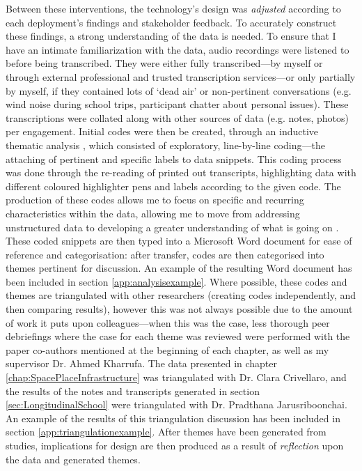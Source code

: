 Between these interventions, the technology's design was \textit{adjusted} according to each deployment's findings and stakeholder feedback. To accurately construct these findings, a strong understanding of the data is needed. To ensure that I have an intimate familiarization with the data, audio recordings were listened to before being transcribed. They were either fully transcribed---by myself or through external professional and trusted transcription services---or only partially by myself, if they contained lots of `dead air' or non-pertinent conversations (e.g. wind noise during school trips, participant chatter about personal issues). These transcriptions were collated along with other sources of data (e.g. notes, photos) per engagement. Initial codes were then be created, through an inductive thematic analysis \citep{nowell2017}, which consisted of exploratory, line-by-line coding---the attaching of pertinent and specific labels to data snippets. This coding process was done through the re-reading of printed out transcripts, highlighting data with different coloured highlighter pens and labels according to the given code. The production of these codes allows me to focus on specific and recurring characteristics within the data, allowing me to move from addressing unstructured data to developing a greater understanding of what is going on \citep{richards2013}. These coded snippets are then typed into a Microsoft Word document for ease of reference and categorisation: after transfer, codes are then categorised into themes pertinent for discussion. An example of the resulting Word document has been included in section \ref{app:analysisexample}. Where possible, these codes and themes are triangulated with other researchers (creating codes independently, and then comparing results), however this was not always possible due to the amount of work it puts upon colleagues---when this was the case, less thorough peer debriefings where the case for each theme was reviewed were performed with the paper co-authors mentioned at the beginning of each chapter, as well as my supervisor Dr. Ahmed Kharrufa. The data presented in chapter \ref{chap:SpacePlaceInfrastructure} was triangulated with Dr. Clara Crivellaro, and the results of the notes and transcripts generated in section \ref{sec:LongitudinalSchool} were triangulated with Dr. Pradthana Jarusriboonchai. An example of the results of this triangulation discussion has been included in section \ref{app:triangulationexample}. After themes have been generated from studies, implications for design are then produced as a result of \textit{reflection} upon the data and generated themes.

